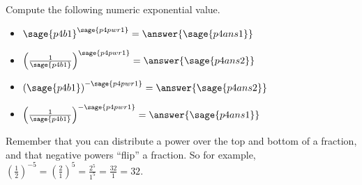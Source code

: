 \documentclass{ximera}
\begin{document}
\begin{problem}
    Compute the following numeric exponential value.
    
    \begin{itemize}
        \item $\sage{p4b1}^{\sage{p4pwr1}} = \answer{\sage{p4ans1}}$
        
        \item $\left(\frac{1}{\sage{p4b1}}\right)^{\sage{p4pwr1}} = \answer{\sage{p4ans2}}$
        
        \item $\left(\sage{p4b1}\right)^{-\sage{p4pwr1}} = \answer{\sage{p4ans2}}$
        
        \item $\left(\frac{1}{\sage{p4b1}}\right)^{-\sage{p4pwr1}} = \answer{\sage{p4ans1}}$
    
    \end{itemize}
    \begin{feedback}
        Remember that you can distribute a power over the top and bottom of a fraction, and that negative powers ``flip'' a fraction. So for example, $\left(\frac{1}{2}\right)^{-5} = \left(\frac{2}{1}\right)^{5} = \frac{2^5}{1^5} = \frac{32}{1} = 32.$
    \end{feedback}
\end{problem}
\end{document}
